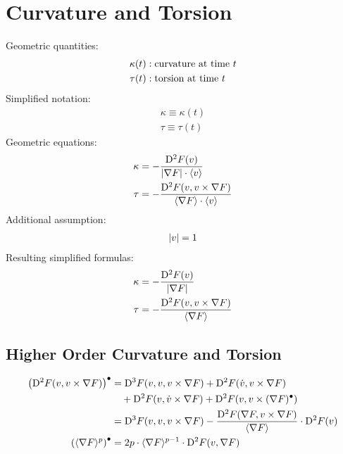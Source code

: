 \section{Curvature and Torsion}


Geometric quantities:
\begin{subequations}
\begin{align}
\kappa( t )  &:  \text{curvature at time $ t $}\\
\tau( t )    &:  \text{torsion at time $ t $}
\end{align}
\end{subequations}
Simplified notation:
\begin{subequations}
\begin{align}
\kappa  \equiv  \kappa( t )\\
\tau    \equiv  \tau( t )
\end{align}
\end{subequations}
Geometric equations:
\begin{subequations}
\begin{align}
\kappa   &=   -\frac{ \mathrm{D}^{  2  } F ( v ) }{ \lvert  \nabla F   \rvert \cdot \langle  v  \rangle }\\
\tau     &=   -\frac{ \mathrm{D}^{  2  } F ( v, v \times \nabla F  ) }{ \langle  \nabla F   \rangle \cdot \langle  v  \rangle }
\end{align}
\end{subequations}
Additional assumption:
\begin{align}
    \lvert  v  \rvert  =  1
\end{align}
Resulting simplified formulas:
\begin{align}
    \kappa   &=
    - \frac{ \mathrm{D}^{  2  } F ( v ) }{ \lvert  \nabla F   \rvert }  \\
    \tau   &=
    - \frac{ \mathrm{D}^{  2  } F ( v, v \times \nabla F  ) }{ \langle  \nabla F   \rangle }
\end{align}


\subsection{Higher Order Curvature and Torsion}



\begin{subequations}
    \begin{align}
        \left( \mathrm{D}^{  2  } F ( v, v \times \nabla F  ) \right)^\bullet   &=
        \mathrm{D}^{ 3 }F( v, v, v \times \nabla F )  +
        \mathrm{D}^{ 2 }F( \dot{ v }, v \times \nabla F )  \\
        &\quad+  \mathrm{D}^{ 2 }F( v, \dot{ v } \times \nabla F )  +
        \mathrm{D}^{ 2 }F( v, v \times ( \nabla F )^\bullet )\\
        &=   \mathrm{D}^{  3  } F ( v, v, v \times \nabla F  )  -
        \frac{ \mathrm{D}^{  2  } F ( \nabla F , v \times \nabla F  ) }{ \langle  \nabla F   \rangle } \cdot
        \mathrm{D}^{  2  } F ( v )   \\
        \left( \langle  \nabla F   \rangle^p \right)^\bullet   &=
        2 p \cdot \langle  \nabla F   \rangle^{p-1} \cdot \mathrm{D}^{  2  } F ( v, \nabla F  )
    \end{align}
\end{subequations}


